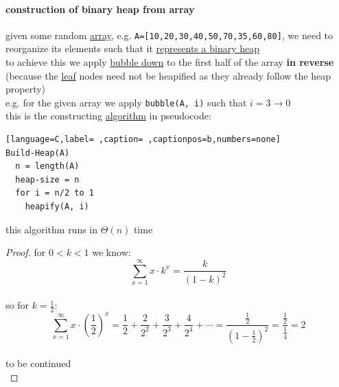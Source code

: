 \documentclass[a4paper,12pt]{article}
\begin{document}
\paragraph{construction of binary heap from array}
\label{sec:org8e8c688}
given some random \href{20220728190531-array.org}{array}, e.g. \texttt{A=[10,20,30,40,50,70,35,60,80]}, we need to reorganize its elements such that it \hyperref[sec:org93e8c49]{represents a binary heap}\\[0pt]
to achieve this we apply \hyperref[sec:org3bbfb76]{bubble down} to the first half of the array \textbf{in reverse} (because the \hyperref[sec:orge114c93]{leaf} nodes need not be heapified as they already follow the heap property)\\[0pt]
e.g. for the given array we apply \texttt{bubble(A, i)} such that \(i = 3 \to 0\)\\[0pt]
this is the constructing \href{20220706211958-algorithm.org}{algorithm} in pseudocode:\\[0pt]
\begin{lstlisting}[language=C,label= ,caption= ,captionpos=b,numbers=none]
Build-Heap(A)
  n = length(A)
  heap-size = n
  for i = n/2 to 1
    heapify(A, i)
\end{lstlisting}
\begin{lemma}
this algorithm runs in \(\Theta(n)\) time\\[0pt]
\begin{proof}
for \(0 < k < 1\) we know:\\[0pt]
\[
  \sum_{x=1}^{\infty} x \cdot k^x = \frac{k}{(1-k)^2}
\]\\[0pt]
so for \(k=\frac12\):\\[0pt]
\[
  \sum_{x=1}^{\infty} x \cdot \left(\frac{1}{2}\right)^x = \frac{1}{2} + \frac{2}{2^2} + \frac{3}{2^3} + \frac{4}{2^4} + \cdots = \frac{\frac{1}{2}}{\left(1-\frac{1}{2}\right)^2} = \frac{\frac{1}{2}}{\frac{1}{4}} = 2
\]\\[0pt]
to be continued\\[0pt]
\end{proof}
\end{lemma}
\end{document}
